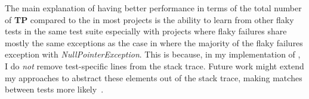 % 
The main explanation of having better performance in terms of the total number of \textbf{TP} compared to the \syntax in most projects is the ability to learn from other flaky tests in the same test suite especially with projects where flaky failures share mostly the same exceptions as the case in \alluxio where the majority of the flaky failures exception with \emph{NullPointerException}. 
This is because, in my implementation of \syntax, I do \emph{not} remove test-specific lines from the stack trace.
Future work might extend my approaches to abstract these elements out of the stack trace, making matches between tests more likely~\cite{An23JustInTime}.


